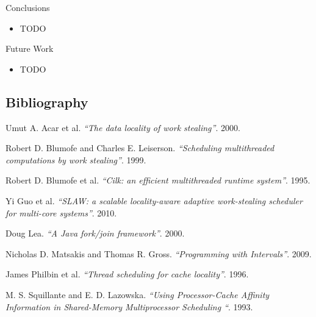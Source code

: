 \begin{frame}{Conclusions}
  \begin{itemize}
  \item TODO
  \end{itemize}
\end{frame}

\note{
}

\begin{frame}{Future Work}
  \begin{itemize}
  \item TODO
  \end{itemize}
\end{frame}

\note{
}

\subsection{Bibliography}

\begin{frame}
  \begin{thebibliography}{10}
    \beamertemplatearticlebibitems

   Umut A. Acar et al. {\em``The data locality
      of work stealing''}. 2000.

   Robert D. Blumofe and Charles
    E. Leiserson. {\em``Scheduling multithreaded computations by work
      stealing''}. 1999.

   Robert D. Blumofe et al. {\em``Cilk: an efficient
      multithreaded runtime system''}. 1995.

   Yi Guo et al. {\em``SLAW: a scalable locality-aware
      adaptive work-stealing scheduler for multi-core
      systems''}. 2010.

   Doug Lea. {\em``A Java fork/join
      framework''}. 2000.

   Nicholas D. Matsakis and Thomas
    R. Gross. {\em``Programming with Intervals''}. 2009.

   James Philbin et al. {\em``Thread
      scheduling for cache locality''}. 1996.

   M. S. Squillante and
    E. D. Lazowska. {\em``Using Processor-Cache Affinity Information
      in Shared-Memory Multiprocessor Scheduling ``}. 1993.

  \end{thebibliography}
\end{frame}



